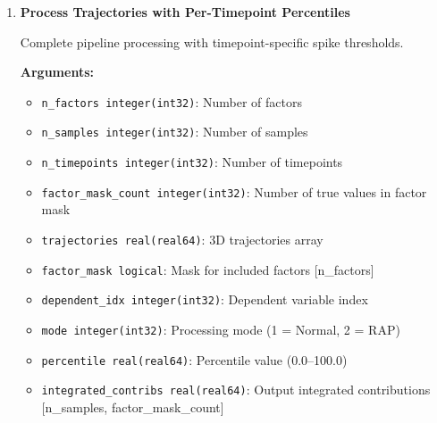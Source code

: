 \documentclass[11pt]{article}
\begin{document}
\begin{enumerate}
\begin{enumerate}
\begin{itemize}
	      	      	\item \texttt{calc\_spike\_thresholds\_alloc}: Handles internal allocation
	      	      	      and sorting
	      	      \end{itemize}
	      	      
	      	\item \textbf{Process Trajectories with Per-Timepoint Percentiles}
	      	      
	      	      Complete pipeline processing with timepoint-specific spike thresholds.
	      	      
	      	      \textbf{Arguments:}
	      	      \begin{itemize}
	      	      	\item \texttt{n\_factors integer(int32)}: Number of factors
	      	      	      
	      	      	\item \texttt{n\_samples integer(int32)}: Number of samples
	      	      	      
	      	      	\item \texttt{n\_timepoints integer(int32)}: Number of timepoints
	      	      	      
	      	      	\item \texttt{factor\_mask\_count integer(int32)}: Number of true values
	      	      	      in factor mask
	      	      	      
	      	      	\item \texttt{trajectories real(real64)}: 3D trajectories array
	      	      	      
	      	      	\item \texttt{factor\_mask logical}: Mask for included factors [n\_factors]
	      	      	      
	      	      	\item \texttt{dependent\_idx integer(int32)}: Dependent variable index
	      	      	      
	      	      	\item \texttt{mode integer(int32)}: Processing mode (1 = Normal, 2 =
	      	      	      RAP)
	      	      	      
	      	      	\item \texttt{percentile real(real64)}: Percentile value (0.0--100.0)
	      	      	      
	      	      	\item \texttt{integrated\_contribs real(real64)}: Output integrated contributions
	      	      	      [n\_samples, factor\_mask\_count]
	      	      	      

\end{itemize}
\end{enumerate}
\end{enumerate}
\end{document}
